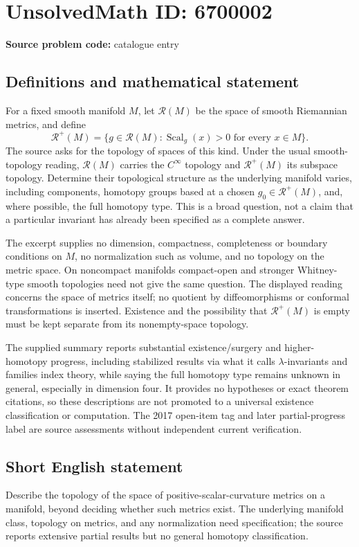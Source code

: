 \documentclass[11pt]{article}
\begin{document}
\section*{UnsolvedMath ID: 6700002}
\textbf{Source problem code:} catalogue entry
\subsection{Definitions and mathematical statement}
For a fixed smooth manifold \(M\), let \(\mathcal R(M)\) be the space of smooth Riemannian metrics, and define
\[
 \mathcal R^+(M)=\{g\in\mathcal R(M):\operatorname{Scal}_g(x)>0
 \text{ for every }x\in M\}.
\]
The source asks for the topology of spaces of this kind. Under the usual smooth-topology reading, \(\mathcal R(M)\) carries the \(C^\infty\) topology and \(\mathcal R^+(M)\) its subspace topology. Determine their topological structure as the underlying manifold varies, including components, homotopy groups based at a chosen \(g_0\in\mathcal R^+(M)\), and, where possible, the full homotopy type. This is a broad question, not a claim that a particular invariant has already been specified as a complete answer.

The excerpt supplies no dimension, compactness, completeness or boundary conditions on \(M\), no normalization such as volume, and no topology on the metric space. On noncompact manifolds compact-open and stronger Whitney-type smooth topologies need not give the same question. The displayed reading concerns the space of metrics itself; no quotient by diffeomorphisms or conformal transformations is inserted. Existence and the possibility that \(\mathcal R^+(M)\) is empty must be kept separate from its nonempty-space topology.

The supplied summary reports substantial existence/surgery and higher-homotopy progress, including stabilized results via what it calls \(\lambda\)-invariants and families index theory, while saying the full homotopy type remains unknown in general, especially in dimension four. It provides no hypotheses or exact theorem citations, so these descriptions are not promoted to a universal existence classification or computation. The 2017 open-item tag and later partial-progress label are source assessments without independent current verification.
\subsection{Short English statement}
Describe the topology of the space of positive-scalar-curvature metrics on a manifold, beyond deciding whether such metrics exist. The underlying manifold class, topology on metrics, and any normalization need specification; the source reports extensive partial results but no general homotopy classification.
\end{document}
